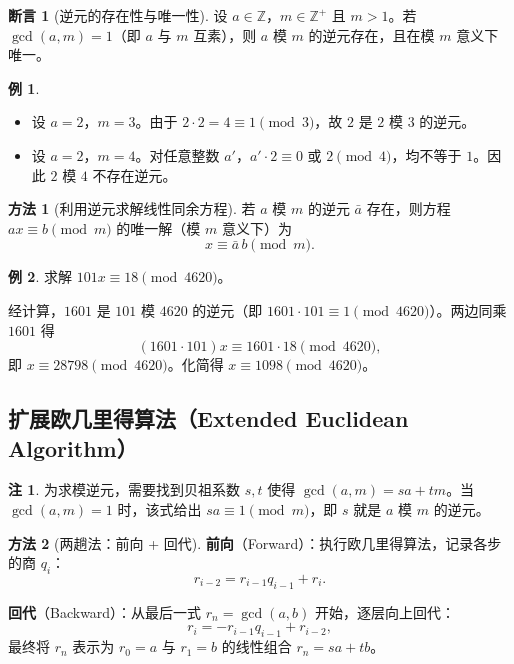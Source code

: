 \documentclass[UTF8,11pt,a4paper]{ctexbook}   %
\theoremstyle{definition}
\newtheorem{example}{例}[section]
\newtheorem{remark}{注}[section]
\newtheorem{method}{方法}[section]
\newtheorem{proposition}{断言}[section]
\begin{document}
\begin{proposition}[逆元的存在性与唯一性]
设 $a\in\mathbb{Z}$，$m\in\mathbb{Z}^+$ 且 $m>1$。若 $\gcd(a,m)=1$（即 $a$ 与 $m$ 互素），则 $a$ 模 $m$ 的逆元存在，且在模 $m$ 意义下唯一。
\end{proposition}

\begin{example}
\begin{itemize}
    \item 设 $a=2$，$m=3$。由于 $2\cdot 2 = 4 \equiv 1 \pmod 3$，故 $2$ 是 $2$ 模 $3$ 的逆元。
    \item 设 $a=2$，$m=4$。对任意整数 $a'$，$a'\cdot 2 \equiv 0$ 或 $2 \pmod 4$，均不等于 $1$。因此 $2$ 模 $4$ 不存在逆元。
\end{itemize}
\end{example}

\begin{method}[利用逆元求解线性同余方程]
若 $a$ 模 $m$ 的逆元 $\bar{a}$ 存在，则方程 $ax \equiv b \pmod m$ 的唯一解（模 $m$ 意义下）为
\[
x \equiv \bar{a}\,b \pmod m.
\]
\end{method}

\begin{example}
求解 $101x \equiv 18 \pmod{4620}$。

经计算，$1601$ 是 $101$ 模 $4620$ 的逆元（即 $1601\cdot 101 \equiv 1 \pmod{4620}$）。两边同乘 $1601$ 得
\[
(1601\cdot 101)x \equiv 1601\cdot 18 \pmod{4620},
\]
即 $x \equiv 28798 \pmod{4620}$。化简得 $x \equiv 1098 \pmod{4620}$。
\end{example}

\subsection{扩展欧几里得算法（Extended Euclidean Algorithm）}

\begin{remark}
为求模逆元，需要找到贝祖系数 $s,t$ 使得 $\gcd(a,m)=sa+tm$。当 $\gcd(a,m)=1$ 时，该式给出 $sa \equiv 1 \pmod m$，即 $s$ 就是 $a$ 模 $m$ 的逆元。
\end{remark}

\begin{method}[两趟法：前向 + 回代]
\textbf{前向}（Forward）：执行欧几里得算法，记录各步的商 $q_i$：
\[
r_{i-2} = r_{i-1}q_{i-1} + r_i.
\]

\textbf{回代}（Backward）：从最后一式 $r_n = \gcd(a,b)$ 开始，逐层向上回代：
\[
r_i = -r_{i-1}q_{i-1} + r_{i-2},
\]
最终将 $r_n$ 表示为 $r_0=a$ 与 $r_1=b$ 的线性组合 $r_n = sa + tb$。
\end{method}
\end{document}
